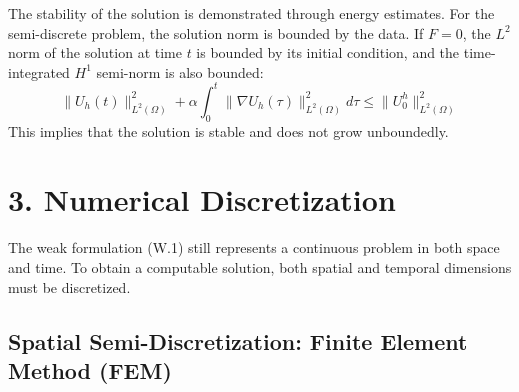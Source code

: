 \documentclass[
  11pt,
]{article}
\begin{document}
\begin{enumerate}
  The stability of the solution is demonstrated through energy
  estimates. For the semi-discrete problem, the solution norm is bounded
  by the data. If $F=0$, the $L^2$ norm of the solution at time
  $t$ is bounded by its initial condition, and the time-integrated
  $H^1$ semi-norm is also bounded: \[
  \|U_h(t)\|_{L^2(\Omega)}^2 + \alpha \int_0^t \|\nabla U_h(\tau)\|_{L^2(\Omega)}^2 d\tau \le \|U_0^h\|_{L^2(\Omega)}^2
  \] This implies that the solution is stable and does not grow
  unboundedly.
\end{enumerate}

\section{3. Numerical Discretization}

The weak formulation (W.1) still represents a continuous problem in both
space and time. To obtain a computable solution, both spatial and
temporal dimensions must be discretized.

\subsection{Spatial Semi-Discretization: Finite Element Method (FEM)}
\end{document}
